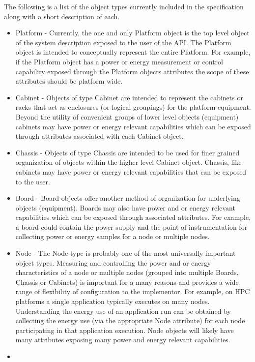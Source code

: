 The following is a list of the object types currently included in the specification along with a short description of each.
\begin{itemize}[noitemsep,nolistsep] %
	\item{
Platform - Currently, the one and only Platform object is the top level object of the system description exposed to the user of the API. 
The Platform object is intended to conceptually represent the entire Platform.
For example, if the Platform object has a power or energy measurement or control capability exposed through the Platform objects attributes the scope of these attributes should be platform wide.
}
	\item{
Cabinet - Objects of type Cabinet are intended to represent the cabinets or racks that act as enclosures (or logical groupings) for the platform equipment. 
Beyond the utility of convenient groups of lower level objects (equipment) cabinets may have power or energy relevant capabilities which can be exposed through attributes associated with each Cabinet object. 
}
	\item{
Chassis - Objects of type Chassis are intended to be used for finer grained organization of objects within the higher level Cabinet object. Chassis, like cabinets may have power or energy relevant capabilities that can be exposed to the user.
}
	\item{
Board - Board objects offer another method of organization for underlying objects (equipment). 
Boards may also have power and or energy relevant capabilities which can be exposed through associated attributes. 
For example, a board could contain the power supply and the point of instrumentation for collecting power or energy samples for a node or multiple nodes.
}
	\item{
Node - The Node type is probably one of the most universally important object types. 
Measuring and controlling the power and or energy characteristics of a node or multiple nodes (grouped into multiple Boards, Chassis or Cabinets) is important for a many reasons and provides a wide range of flexibility of configuration to the implementor. 
For example, on HPC platforms a single application typically executes on many nodes. 
Understanding the energy use of an application run can be obtained by collecting the energy use (via the appropriate Node attribute) for each node participating in that application execution. 
Node objects will likely have many attributes exposing many power and energy relevant capabilities.
}
	\item{
}
\end{itemize}
